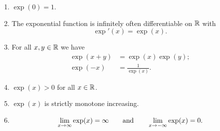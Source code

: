 \begin{theorem}\label{thm:pow_series_def_e}
    \begin{enumerate}[label = (\roman*)]
        \item $\exp(0) = 1$.

        \item The exponential function is infinitely often differentiable on $\R$ with
        \[
        \exp'(x) = \exp(x).
        \]

        \item For all $x, y \in \R$ we have
        \begin{align*}
            \exp(x + y) &= \exp(x)\exp(y); \\
            \exp(-x) &= \frac{1}{\exp(x)}.
        \end{align*}

        \item $\exp(x) > 0$ for all $x \in \R$.

        \item $\exp(x)$ is strictly monotone increasing.

        \item
        \[
        \liminfty[x]\exp(x) = \infty\qquad\text{and}\qquad\lim_{x \to -\infty}\exp(x) = 0.
        \]
    \end{enumerate}
\end{theorem}
